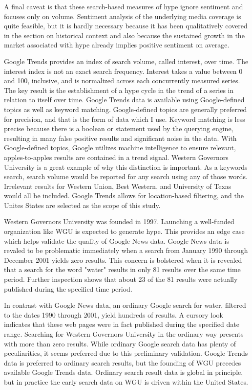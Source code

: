 \documentclass[review]{elsarticle}
\begin{document}
    A final caveat is that these search-based measures of hype ignore sentiment and focuses only on volume.
    Sentiment analysis of the underlying media coverage is quite feasible,
    but it is hardly necessary because it has been qualitatively covered in the section on historical context
    and also because the sustained growth in the market associated with hype already implies positive sentiment on average.

    Google Trends provides an index of search volume, called interest, over time.
    The interest index is not an exact search frequency.
    Interest takes a value between 0 and 100, inclusive, and is normalized across each concurrently measured series.
    The key result is the establishment of a hype cycle in the trend of a series in relation to itself over time.
    Google Trends data is available using Google-defined topics as well as keyword matching.
    Google-defined topics are generally preferred for precision, and that is the form of data which I use.
    Keyword matching is less precise because there is a boolean or statement used by the querying engine, resulting in many false positive results and significant noise in the data.
    With Google-defined topics, Google utilizes machine intelligence to ensure relevant, apples-to-apples results are contained in a trend signal.
    Western Governors University is a great example of why this distinction is important.
    As a keywords search, search volume would be reported for any search using any of those words.
    Irrelevant results for Western Union, Best Western, and University of Texas would all be included.
    Google Trends allows for location-based filtering, and the Unites States are selected as the scope of this study.
    
    Western Governors University was founded in 1997.
    Launching a well-funded organization like WGU is expected to generate hype.
    This provides an edge case which helps validate the quality of Google News data.
    Google News data is revaled to be problematic immediately when a search from January 1990 through December 2001 yields zero results.
    This concern is bolstered when it is revealed that a search for the word "water" results in only 81 results over the same time period.
    Further inspection shows that about 23 of the 81 results were actually published during the specified time period.
    
    In contrast with Google News data, an ordinary Google search for water, filtered to the dates 1990 through 2001, yield hundreds of results.
    A cursory look indicates that these web pages were in fact published during the specified date range.
    Searching for Western Governors University in the ordinary way presents with more than zero results.
    While ordinary Google search data has plenty of peculiarities, it seems preferred due to this preliminary validation.
    Google Trends data is preferred to ordinary search results, but the founding of WGU precedes available Google Trends data.
    Ordinary search result data is global in principle, but in practice the early search data on WGU is driven within the United States.
\end{document}
